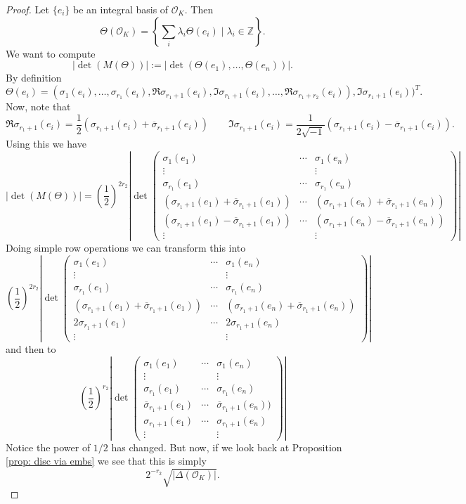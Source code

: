 \documentclass[11pt,a4paper]{report}
\theoremstyle{plain}
\theoremstyle{definition}
\theoremstyle{definition}
\newcommand{\ZZ}{\mathbb{Z}}
\def \s {\sigma}
\def \lam {\lambda}
\def \OO {\mathcal{O}}
\def \s {\sigma}
\def \ov{\overline}
\begin{document}
	\begin{proof}
		Let $\{e_i\}$ be an integral basis of $\OO_K$. Then \[\Theta(\OO_K)=\left \{\sum_i \lam_i \Theta(e_i) \mid \lam_i \in \ZZ \right \}.\] We want to compute \[|\det(M(\Theta))|:=|\det(\Theta(e_1),\dots,\Theta(e_n))| .\] By definition \[\Theta(e_i)=(\s_1(e_i),\dots,\s_{r_1}(e_i),\Re \s_{r_1+1}(e_i),\Im\s_{r_1+1}(e_i), \dots,\Re \s_{r_1+r_2}(e_i)), \Im \s_{r_1+1}(e_i)             )^T.\] Now, note that \[\Re \s_{r_1+1}(e_i)=\frac{1}{2}(\s_{r_1+1}(e_i) + \ov{\s}_{r_1+1}(e_i)) \qquad \Im \s_{r_1+1}(e_i)=\frac{1}{2\sqrt{-1}}(\s_{r_1+1}(e_i) - \ov{\s}_{r_1+1}(e_i)).\] Using this we have \[|\det(M(\Theta))|= \left (\frac{1}{2} \right )^{2r_2} \left | \det \left (\begin{matrix} \sigma_1(e_1) &\cdots& \sigma_1(e_n)\\ \vdots & & \vdots \\  \sigma_{r_1}(e_1) &\cdots& \sigma_{r_1}(e_n) \\  (\s_{r_1+1}(e_1) + \ov{\s}_{r_1+1}(e_1)) &\cdots& (\s_{r_1+1}(e_n) + \ov{\s}_{r_1+1}(e_n)) \\(\s_{r_1+1}(e_1) - \ov{\s}_{r_1+1}(e_1)) &\cdots& (\s_{r_1+1}(e_n) - \ov{\s}_{r_1+1}(e_n))\\ \vdots && \vdots
		\end{matrix} \right ) \right |     \] Doing simple row operations we can transform this into \[\left (\frac{1}{2} \right )^{2r_2} \left | \det \left (\begin{matrix} \sigma_1(e_1) &\cdots& \sigma_1(e_n)\\ \vdots & & \vdots \\  \sigma_{r_1}(e_1) &\cdots& \sigma_{r_1}(e_n) \\  (\s_{r_1+1}(e_1) + \ov{\s}_{r_1+1}(e_1)) &\cdots& (\s_{r_1+1}(e_n) + \ov{\s}_{r_1+1}(e_n)) \\2\s_{r_1+1}(e_1) &\cdots& 2\s_{r_1+1}(e_n)\\ \vdots && \vdots
		\end{matrix} \right ) \right |     \] and then to\[\left (\frac{1}{2} \right )^{r_2} \left | \det \left (\begin{matrix} \sigma_1(e_1) &\cdots& \sigma_1(e_n)\\ \vdots & & \vdots \\  \sigma_{r_1}(e_1) &\cdots& \sigma_{r_1}(e_n) \\   \ov{\s}_{r_1+1}(e_1) &\cdots&  \ov{\s}_{r_1+1}(e_n)) \\\s_{r_1+1}(e_1) &\cdots& \s_{r_1+1}(e_n)\\ \vdots && \vdots
		\end{matrix} \right ) \right |     \] Notice the power of $1/2$ has changed. But now, if we look back at Proposition \ref{prop: disc via embs} we see that this is simply \[2^{-r_2} \sqrt{|\Delta(\OO_K)|}.\]
		

\end{proof}
\end{document}
